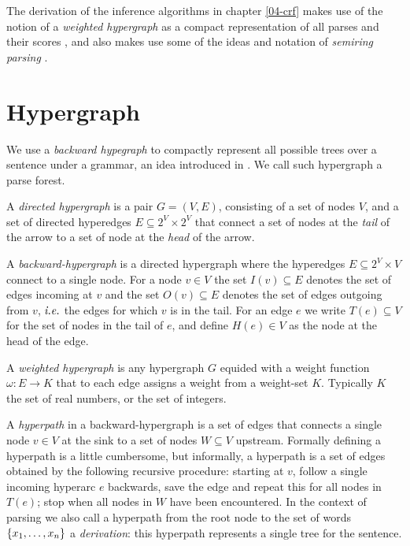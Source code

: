 % 

The derivation of the inference algorithms in chapter \ref{04-crf} makes use of the notion of a \textit{weighted hypergraph} as a compact representation of all parses and their scores \citep{gallo1993directed,klein2004parsing}, and also makes use some of the ideas and notation of \textit{semiring parsing} \citep{goodman1999semiring,eisner2009semirings}.


\section{Hypergraph}
  We use a \textit{backward hypegraph} to compactly represent all possible trees over a sentence under a grammar, an idea introduced in \citet{klein2004parsing}. We call such hypergraph a parse forest.

  \begin{definition}{}
    A \textit{directed hypergraph} is a pair $G = (V, E)$, consisting of a set of nodes $V$, and a set of directed hyperedges $E \subseteq 2^V \times 2^V$ that connect a set of nodes at the \textit{tail} of the arrow to a set of node at the \textit{head} of the arrow.
  \end{definition}

  \begin{definition}{}
    A \textit{backward-hypergraph} is a directed hypergraph where the hyperedges $E \subseteq 2^V \times V$ connect to a single node. For a node $v \in V$ the set $I(v) \subseteq E$ denotes the set of edges incoming at $v$ and the set $O(v) \subseteq E$ denotes the set of edges outgoing from $v$, $\emph{i.e.}$ the edges for which $v$ is in the tail. For an edge $e$ we write $T(e) \subseteq V$ for the set of nodes in the tail of $e$, and define $H(e) \in V$ as the node at the head of the edge.
  \end{definition}

  \begin{definition}{}
     A \textit{weighted hypergraph} is any hypergraph $G$ equided with a weight function $\omega : E \to K$ that to each edge assigns a weight from a weight-set $K$. Typically $K$ the set of real numbers, or the set of integers.
  \end{definition}

  \begin{definition}{}
    A \textit{hyperpath} in a backward-hypergraph is a set of edges that connects a single node $v \in V$ at the sink to a set of nodes $W \subseteq V$ upstream. Formally defining a hyperpath is a little cumbersome, but informally, a hyperpath is a set of edges obtained by the following recursive procedure: starting at $v$, follow a single incoming hyperarc $e$ backwards, save the edge and repeat this for all nodes in $T(e)$; stop when all nodes in $W$ have been encountered. In the context of parsing we also call a hyperpath from the root node to the set of words $\{ x_1, \dots, x_n \}$ a \textit{derivation}: this hyperpath represents a single tree for the sentence.
  \end{definition}

